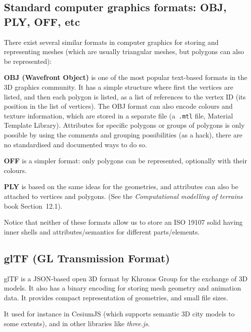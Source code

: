 \subsection{Standard computer graphics formats: OBJ, PLY, OFF, etc}

There exist several similar formats in computer graphics for storing and representing meshes (which are usually triangular meshes, but polygons can also be represented):

\textbf{OBJ (Wavefront Object)} is one of the most popular text-based formats in the 3D graphics community.
It has a simple structure where first the vertices are listed, and then each polygon is listed, as a list of references to the vertex ID (its position in the list of vertices).
The OBJ format can also encode colours and texture information, which are stored in a separate file (a~\texttt{.mtl} file, Material Template Library).
Attributes for specific polygons or groups of polygons is only possible by using the comments and grouping possibilities (as a hack), there are no standardised and documented ways to do so.

\textbf{OFF} is a simpler format: only polygons can be represented, optionally with their colours.

\textbf{PLY} is based on the same ideas for the geometries, and attributes can also be attached to vertices and polygons. (See the \emph{Computational modelling of terrains} book Section~12.1).

Notice that neither of these formats allow us to store an ISO 19107 solid having inner shells and attributes/semantics for different parts/elements.


\subsection{glTF (GL Transmission Format)}
glTF is a JSON-based open 3D format by Khronos Group for the exchange of 3D models.
It also has a binary encoding for storing mesh geometry and animation data.
It provides compact representation of geometries, and small file sizes.

It used for instance in CesiumJS (which supports semantic 3D city models to some extents), and in other libraries like \emph{three.js}.

